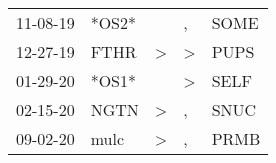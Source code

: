 \begin{supertabular}{p{0.07\textwidth}p{0.06\textwidth}p{0.02\textwidth}p{0.02\textwidth}p{0.06\textwidth}}
          11-08-19\textsuperscript{} &                   *OS2* &               &                , &  SOME\textsuperscript{} \\
          12-27-19\textsuperscript{} &  FTHR\textsuperscript{} &  \textgreater &     \textgreater &  PUPS\textsuperscript{} \\
          01-29-20\textsuperscript{} &                   *OS1* &               &     \textgreater &  SELF\textsuperscript{} \\
          02-15-20\textsuperscript{} &  NGTN\textsuperscript{} &  \textgreater &                , &  SNUC\textsuperscript{} \\
          09-02-20\textsuperscript{} &  mulc\textsuperscript{} &  \textgreater &                , &  PRMB\textsuperscript{} \\
\end{supertabular}
